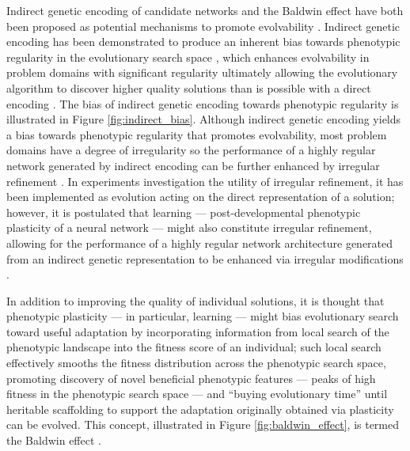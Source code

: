 Indirect genetic encoding of candidate networks and the Baldwin effect have both been proposed as potential mechanisms to promote evolvability \cite{Reisinger2007AcquiringRepresentations,Downing2010TheNetworks}. Indirect genetic encoding has been demonstrated to produce an inherent bias towards phenotypic regularity in the evolutionary search space \cite{Tonelli2013OnNetworks}, which enhances evolvability in problem domains with significant regularity ultimately allowing the evolutionary algorithm to discover higher quality solutions than is possible with a direct encoding \cite{Clune2011OnRegularity}. The bias of indirect genetic encoding towards phenotypic regularity is illustrated in Figure \ref{fig:indirect_bias}. Although indirect genetic encoding yields a bias towards phenotypic regularity that promotes evolvability, most problem domains have a degree of irregularity so the performance of a highly regular network generated by indirect encoding can be further enhanced by irregular refinement \cite{Clune2011OnRegularity}. In experiments investigation the utility of irregular refinement, it has been implemented as evolution acting on the direct representation of a solution; however, it is postulated that learning --- post-developmental phenotypic plasticity of a neural network --- might also constitute irregular refinement, allowing for the performance of a highly regular network architecture generated from an indirect genetic representation to be enhanced via irregular modifications \cite{Clune2011OnRegularity}. 

In addition to improving the quality of individual solutions, it is thought that phenotypic plasticity --- in particular, learning --- might bias evolutionary search toward useful adaptation by incorporating information from local search of the phenotypic landscape into the fitness score of an individual; such local search effectively smooths the fitness distribution across the phenotypic search space, promoting discovery of novel beneficial phenotypic features --- peaks of high fitness in the phenotypic search space --- and ``buying evolutionary time'' until heritable scaffolding to support the adaptation originally obtained via plasticity can be evolved. This concept, illustrated in Figure \ref{fig:baldwin_effect}, is termed the Baldwin effect \cite{Downing2010TheNetworks,Downing2009ComputationalEffect}.




